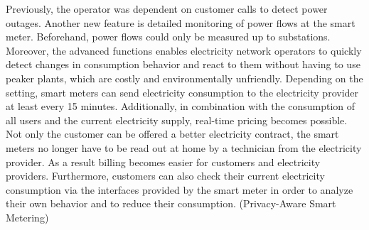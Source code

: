 Previously, the operator was dependent on customer calls to detect power outages. Another new feature is detailed monitoring of power flows at the smart meter. Beforehand, power flows could only be measured up to substations. Moreover, the advanced functions enables electricity network operators to quickly detect changes in consumption behavior and react to them without having to use peaker plants, which are costly and environmentally unfriendly. Depending on the setting, smart meters can send electricity consumption to the electricity provider at least every 15 minutes. Additionally, in combination with the consumption of all users and the current electricity supply, real-time pricing becomes possible. Not only the customer can be offered a better electricity contract, the smart meters no longer have to be read out at home by a technician from the electricity provider. As a result billing becomes easier for customers and electricity providers. Furthermore, customers can also check their current electricity consumption via the interfaces provided by the smart meter in order to analyze their own behavior and to reduce their consumption. (Privacy-Aware Smart Metering)

